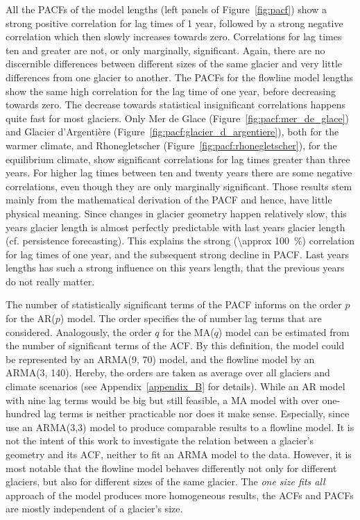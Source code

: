       All the PACFs of the \vas{} model lengths (left panels of Figure~\ref{fig:pacf}) show a strong positive correlation for lag times of 1 year, followed by a strong negative correlation which then slowly increases towards zero. Correlations for lag times ten and greater are not, or only marginally, significant. Again, there are no discernible differences between different sizes of the same glacier and very little differences from one glacier to another. The PACFs for the flowline model lengths show the same high correlation for the lag time of one year, before decreasing towards zero. The decrease towards statistical insignificant correlations happens quite fast for most glaciers. Only Mer de Glace (Figure~\ref{fig:pacf:mer_de_glace}) and Glacier d'Argentière (Figure~\ref{fig:pacf:glacier_d_argentiere}), both for the warmer climate, and Rhonegletscher (Figure~\ref{fig:pacf:rhonegletscher}), for the equilibrium climate, show significant correlations for lag times greater than three years. For higher lag times between ten and twenty years there are some negative correlations, even though they are only marginally significant. Those results stem mainly from the mathematical derivation of the PACF and  hence, have little physical meaning. Since changes in glacier geometry happen relatively slow, this years glacier length is almost perfectly predictable with last years glacier length (cf. persistence forecasting). This explains the strong (\SI{\approx 100}{\percent}) correlation for lag times of one year, and the subsequent strong decline in PACF. Last years lengths has such a strong influence on this years length, that the previous years do not really matter.

      The number of statistically significant terms of the PACF informs on the order $p$ for the AR($p$) model. The order specifies the of number lag terms that are considered. Analogously, the order $q$ for the MA($q$) model can be estimated from the number of significant terms of the ACF. By this definition, the \vas{} model could be represented by an ARMA(9, 70) model, and the flowline model by an ARMA(3, 140). Hereby, the orders are taken as average over all glaciers and climate scenarios (see Appendix~\ref{appendix_B} for details). While an AR model with nine lag terms would be big but still feasible, a MA model with over one-hundred lag terms is neither practicable nor does it make sense. Especially, since \citet{Roe2014} use an ARMA(3,3) model to produce comparable results to a flowline model. It is not the intent of this work to investigate the relation between a glacier's geometry and its ACF, neither to fit an ARMA model to the data. However, it is most notable that the flowline model behaves differently not only for different glaciers, but also for different sizes of the same glacier. The \textit{one size fits all} approach of the \vas{} model produces more homogeneous results, the ACFs and PACFs are mostly independent of a glacier's size.

